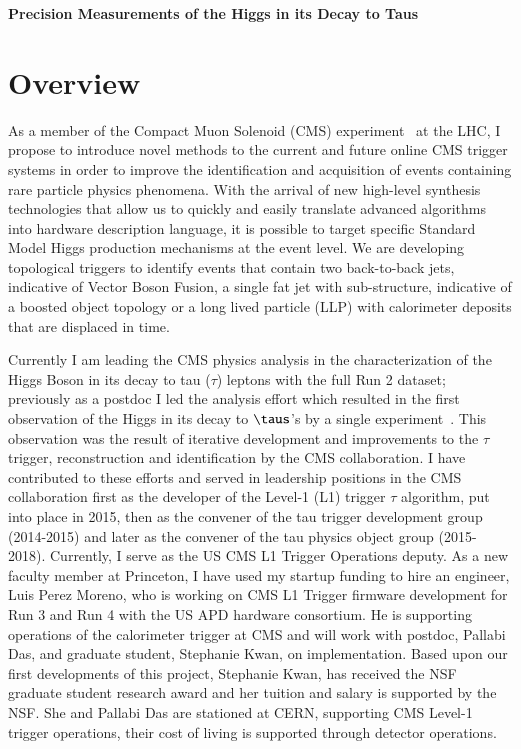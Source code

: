 \documentclass[preprint,12pt]{elsarticle}
\begin{document}





\noindent
\textbf{Precision Measurements of the Higgs in its Decay to Taus}

\section{Overview}
As a member of the Compact Muon Solenoid (CMS) experiment~\cite{CMS-JINST} at the LHC, 
I propose to introduce novel methods to the current and future online CMS trigger systems 
in order to improve the identification and acquisition of events containing rare particle
physics phenomena. 
With the arrival of new high-level synthesis technologies that allow us
to quickly and easily translate advanced algorithms into hardware 
description language, it is possible to target specific Standard Model Higgs
production mechanisms at the event level. We are developing topological triggers 
to identify events that contain two back-to-back jets, indicative of 
Vector Boson Fusion, a single fat jet with sub-structure, indicative of a boosted
object topology or a long lived particle (LLP) with calorimeter deposits that are
displaced in time. %

Currently I am leading the CMS physics analysis in the characterization of the Higgs 
Boson in its decay to tau ($\tau$) leptons with the full Run 2 dataset; previously as 
a postdoc I led the analysis effort which resulted in the first observation of the 
Higgs in its decay to $\taus$'s by a single experiment~\cite{HIG16043}. 
This observation was the 
result of iterative development and improvements to the $\tau$ trigger, reconstruction 
and identification by the CMS collaboration. I have contributed to these efforts and served 
in leadership positions in the CMS collaboration first as the developer of the Level-1 (L1)
trigger $\tau$ algorithm, put into place in 2015, then as the convener of the tau trigger
development group (2014-2015) and later as the convener of the tau physics object group 
(2015-2018). Currently, I serve as the US CMS L1 Trigger Operations deputy. 
As a new faculty member at Princeton, I have used my startup funding to hire an 
engineer, Luis Perez Moreno, who is working on CMS L1 Trigger firmware development
for Run 3 and Run 4 with the US APD hardware consortium. He is supporting operations 
of the calorimeter trigger at 
CMS and will work with postdoc, Pallabi Das, and graduate student, Stephanie Kwan, on
implementation. Based upon our first developments of
this project, Stephanie Kwan, has received the NSF graduate student research award
and her tuition and salary is supported by the NSF. She and Pallabi Das are stationed
at CERN, supporting CMS Level-1 trigger operations, their cost of living is supported 
through detector operations.
\end{document}
